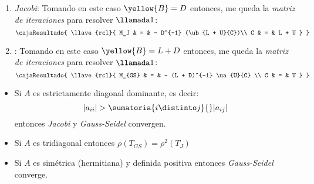 \begin{enumerate}[label=\tiny\purple{\faIcon{snowman}}]
        \begin{enumerate}[label=\tiny\violet{\faIcon{pray})}]

          \item \textit{Jacobi}: Tomando en este caso $\yellow{B} = D$
                entonces, me queda la \textit{matriz de iteraciones} para resolver $\llamada1$:
                $$
                  \cajaResultado{
                    \llave{rcl}{
                      M_J & = & - D^{-1} (\ub{L + U}{C})\\
                      C   & = & L + U
                    }
                  }
                $$

          \item {}: Tomando en este caso $\yellow{B} = L + D$
                entonces, me queda la \textit{matriz de iteraciones} para resolver $\llamada1$:
                $$
                  \cajaResultado{
                    \llave{rcl}{
                      M_{GS} & = & - (L + D)^{-1} \ua{U}{C} \\
                      C & = & U
                    }
                  }
                $$
        \end{enumerate}

        \begin{itemize}
          \item Si $A$ es estrictamente diagonal dominante, es decir:
                $$
                  |a_{ii}| > \sumatoria{i \distinto j}{} |a_{ij}|
                $$
                entonces \textit{Jacobi} y \textit{Gauss-Seidel} convergen.

          \item Si $A$ es tridiagonal entonces $\rho(T_{GS}) = \rho^2(T_{J})$

          \item Si $A$ es simétrica (hermitiana) y definida positiva entonces \textit{Gauss-Seidel} converge.
        \end{itemize}
\end{enumerate}
